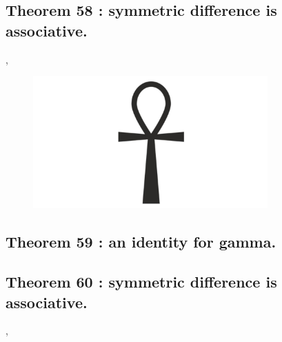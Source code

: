 \documentclass[preview]{standalone}
\begin{document}
\subsection[Symmetric difference is associative.]
    {
        \color{section}Theorem 58 \color{black} : symmetric difference is associative.
    }

\sep
\pagebreak


\begin{figure}[!h]
    \centering
    \includegraphics[width=9cm]{../resources/jpg/2.2.set.operations/ankh.jpg}
\end{figure}
\subsection[An identity for gamma.]
    {
        \color{section}Theorem 59 \color{black} : an identity for gamma.
    }

\pagebreak


\subsection[Symmetric difference is associative.]
    {
        \color{section}Theorem 60 \color{black} : symmetric difference is associative.
    }

\sep
\pagebreak

\end{document}
